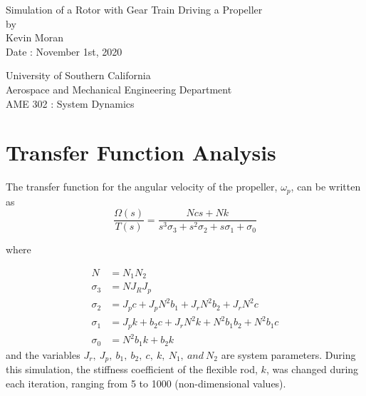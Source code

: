 \documentclass[letterpaper,12pt]{article}
\begin{document}
\begin{titlepage}
 \begin{center}
 \vspace*{1in}
{\Huge Simulation of a Rotor with Gear Train Driving a Propeller}\\
    \bigskip
    by\\
    \bigskip
    {\Large Kevin Moran} \\
    \bigskip
    Date : November 1st, 2020

    \bigskip\bigskip\bigskip
    University of Southern California\\
    Aerospace and Mechanical Engineering Department\\
    AME 302 : System Dynamics
 \end{center}
\end{titlepage}


\section{Transfer Function Analysis}
The transfer function for the angular velocity of the propeller, $\omega_p$, can be written as
\begin{equation}
    \frac{\Omega (s)}{T (s)} = \frac{Ncs + Nk}{s^3\sigma_3 + s^2\sigma_2 + s\sigma_1 + \sigma_0}
\end{equation}

where

\begin{align*}
        N &= N_1N_2\\
        \sigma_3 &= NJ_RJ_p \\
        \sigma_2 &= J_pc + J_pN^2b_1 + J_rN^2b_2 + J_rN^2c\\
        \sigma_1 &= J_pk + b_2c + J_rN^2k + N^2b_1b_2 + N^2b_1c\\
        \sigma_0 &= N^2b_1k + b_2k
\end{align*}
and the variables $J_r,\ J_p,\ b_1,\ b_2,\ c,\ k,\ N_1,\ and \ N_2$ are system parameters. During this simulation, the stiffness coefficient of the flexible rod, $k$, was changed during each iteration, ranging from 5 to 1000 (non-dimensional values). 
\end{document}
